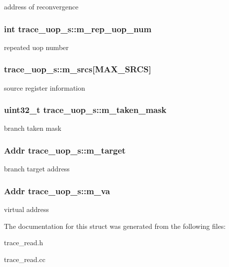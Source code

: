 \label{structtrace__uop__s_a85a2ce721949b132c64557ceb52b4769}
address of reconvergence \hypertarget{structtrace__uop__s_a08cd0b183e35fa0e272926ed697b3817}{
\subsubsection[{m\_\-rep\_\-uop\_\-num}]{\setlength{\rightskip}{0pt plus 5cm}int {\bf trace\_\-uop\_\-s::m\_\-rep\_\-uop\_\-num}}}
\label{structtrace__uop__s_a08cd0b183e35fa0e272926ed697b3817}
repeated uop number \hypertarget{structtrace__uop__s_ac5ebcda38121f83dc3c809d4d8e0389f}{
\subsubsection[{m\_\-srcs}]{ {\bf trace\_\-uop\_\-s::m\_\-srcs}\mbox{[}MAX\_\-SRCS\mbox{]}}}
\label{structtrace__uop__s_ac5ebcda38121f83dc3c809d4d8e0389f}
source register information \hypertarget{structtrace__uop__s_a83259732bcf81ceee2aac00a6fd773f5}{
\subsubsection[{m\_\-taken\_\-mask}]{\setlength{\rightskip}{0pt plus 5cm}uint32\_\-t {\bf trace\_\-uop\_\-s::m\_\-taken\_\-mask}}}
\label{structtrace__uop__s_a83259732bcf81ceee2aac00a6fd773f5}
branch taken mask \hypertarget{structtrace__uop__s_ac2f3700ad5a2adde36180f5cf943a096}{
\subsubsection[{m\_\-target}]{\setlength{\rightskip}{0pt plus 5cm}Addr {\bf trace\_\-uop\_\-s::m\_\-target}}}
\label{structtrace__uop__s_ac2f3700ad5a2adde36180f5cf943a096}
branch target address \hypertarget{structtrace__uop__s_afb7847a5a6cd06570e44563c44891c69}{
\subsubsection[{m\_\-va}]{\setlength{\rightskip}{0pt plus 5cm}Addr {\bf trace\_\-uop\_\-s::m\_\-va}}}
\label{structtrace__uop__s_afb7847a5a6cd06570e44563c44891c69}
virtual address 

The documentation for this struct was generated from the following files:\begin{DoxyCompactItemize}
\item 
trace\_\-read.h\item 
trace\_\-read.cc\end{DoxyCompactItemize}
